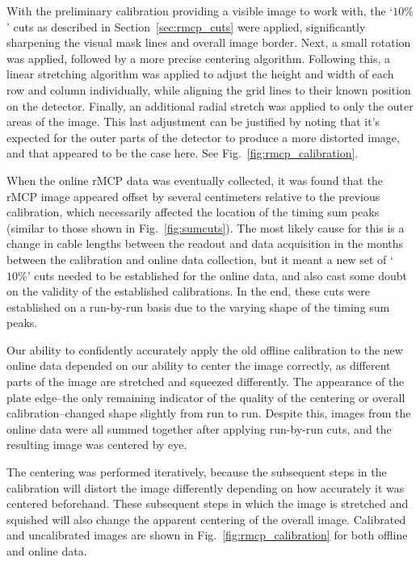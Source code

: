 With the preliminary calibration providing a visible image to work with, the `$10\%$' cuts as described in Section~\ref{sec:rmcp_cuts} were applied, significantly sharpening the visual mask lines and overall image border. Next, a small rotation was applied, followed by a more precise centering algorithm. Following this, a linear stretching algorithm was applied to adjust the height and width of each row and column individually, while aligning the grid lines to their known position on the detector.  Finally, an additional radial stretch was applied to only the outer areas of the image.  This last adjustment can be justified by noting that it's expected for the outer parts of the detector to produce a more distorted image, and that appeared to be the case here.  See Fig.~\ref{fig:rmcp_calibration}.

When the online rMCP data was eventually collected, it was found that the rMCP image appeared offset by several centimeters relative to the previous calibration, which necessarily affected the location of the timing sum peaks (similar to those shown in Fig.~\ref{fig:sumcuts}).  The most likely cause for this is a change in cable lengths between the readout and data acquisition in the months between the calibration and online data collection, but it meant a new set of `$10\%$' cuts needed to be established for the online data, and also cast some doubt on the validity of the established calibrations.  In the end, these cuts were established on a run-by-run basis due to the varying shape of the timing sum peaks.  

Our ability to confidently accurately apply the old offline calibration to the new online data depended on our ability to center the image correctly, as different parts of the image are stretched and squeezed differently.  The appearance of the plate edge--the only remaining indicator of the quality of the centering or overall calibration--changed shape slightly from run to run.  Despite this, images from the online data were all summed together after applying run-by-run cuts, and the resulting image was centered by eye.  

The centering was performed iteratively, because the subsequent steps in the calibration will distort the image differently depending on how accurately it was centered beforehand.  These subsequent steps in which the image is stretched and squished will also change the apparent centering of the overall image.  Calibrated and uncalibrated images are shown in Fig.~\ref{fig:rmcp_calibration} for both offline and online data.

